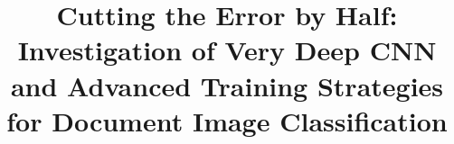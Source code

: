 \documentclass[conference]{IEEEtran}
\begin{document}



\title{Cutting the Error by Half: Investigation of Very Deep CNN and Advanced Training Strategies for Document Image Classification}

\makeatletter

\def\footnoterule{\relax%
  \kern-5pt
  \hbox to \columnwidth{\hfill\vrule width 0.5\columnwidth height 0.4pt\hfill}
  \kern4.6pt}

\makeatother









\maketitle

\IEEEpeerreviewmaketitle





%


 


\ifCLASSOPTIONcaptionsoff
  \newpage
\fi




\end{document}
